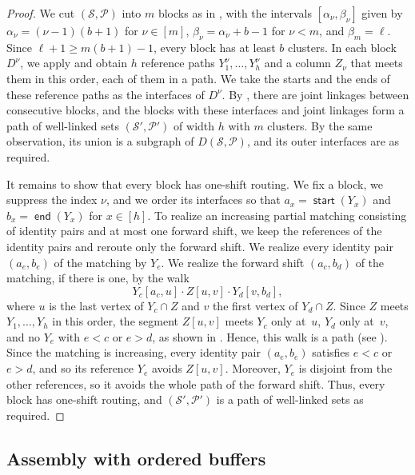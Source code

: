 \documentclass[fontsize=12pt,leading=14pt]{fullpaper}
\DeclareMathOperator{\st}{\mathsf{start}}
\DeclareMathOperator{\en}{\mathsf{end}}
\newcommand{\Pcal}{\mathcal{P}}
\newcommand{\Scal}{\mathcal{S}}
\begin{document}
\begin{proof}
  We cut $(\Scal,\Pcal)$ into $m$ blocks as in , with the intervals $[\alpha_\nu,\beta_\nu]$ given by $\alpha_\nu=(\nu-1)(b+1)$ for $\nu\in[m]$, $\beta_\nu=\alpha_\nu+b-1$ for $\nu<m$, and $\beta_m=\ell$.
  Since $\ell+1\ge m(b+1)-1$, every block has at least $b$ clusters.
  In each block $D^\nu$, we apply  and obtain $h$ reference paths $Y^\nu_1,\dots,Y^\nu_h$ and a column $Z_\nu$ that meets them in this order, each of them in a path.
  We take the starts and the ends of these reference paths as the interfaces of $D^\nu$.
  By , there are joint linkages between consecutive blocks, and the blocks with these interfaces and joint linkages form a path of well-linked sets $(\Scal',\Pcal')$ of width $h$ with $m$ clusters.
  By the same observation, its union is a subgraph of $D(\Scal,\Pcal)$, and its outer interfaces are as required.

  It remains to show that every block has one-shift routing.
  We fix a block, we suppress the index $\nu$, and we order its interfaces so that $a_x=\st(Y_x)$ and $b_x=\en(Y_x)$ for $x\in[h]$.
  To realize an increasing partial matching consisting of identity pairs and at most one forward shift, we keep the references of the identity pairs and reroute only the forward shift.
  We realize every identity pair $(a_e,b_e)$ of the matching by $Y_e$.
  We realize the forward shift $(a_c,b_d)$ of the matching, if there is one, by the walk
  \[
    Y_c[a_c,u]\cdot Z[u,v]\cdot Y_d[v,b_d],
  \]
  where $u$ is the last vertex of $Y_c\cap Z$ and $v$ the first vertex of $Y_d\cap Z$.
  Since $Z$ meets $Y_1,\dots,Y_h$ in this order, the segment $Z[u,v]$ meets $Y_c$ only at~$u$, $Y_d$ only at~$v$, and no $Y_e$ with $e<c$ or $e>d$, as shown in .
  Hence, this walk is a path (see ).
  Since the matching is increasing, every identity pair $(a_e,b_e)$ satisfies $e<c$ or $e>d$, and so its reference $Y_e$ avoids $Z[u,v]$.
  Moreover, $Y_e$ is disjoint from the other references, so it avoids the whole path of the forward shift.
  Thus, every block has one-shift routing, and $(\Scal',\Pcal')$ is a path of well-linked sets as required.
\end{proof}

\subsection{Assembly with ordered buffers}\label{sec:s3-assembly}
\end{document}
